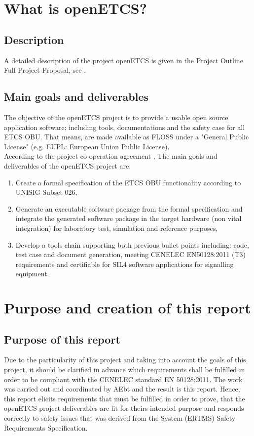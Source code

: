 \documentclass{template/openetcs_report}
\begin{document}
\chapter{What is openETCS?}

\section{Description}
A detailed description of the project openETCS is given in the Project Outline Full Project
Proposal, see \cite{FPP13}.

\section{Main goals and deliverables}
The objective of the openETCS project is to provide a usable open source application software; including tools, documentations and the safety case for all ETCS OBU. That means, are made available as FLOSS under a "General Public License" (e.g. EUPL: European Union Public License).
\\
According to the project co-operation agreement \cite{PCA12}, The main goals and deliverables of the openETCS project are:
\begin{enumerate}
  \item Create a formal specification of the ETCS OBU functionality according to UNISIG Subset 026,
  \item Generate an executable software package from the formal specification and integrate the generated software package in the target hardware (non vital integration) for laboratory test, simulation and reference purposes,  
  \item Develop a tools chain supporting both previous bullet points including: code, test case and document generation, meeting CENELEC EN50128:2011 (T3) requirements and certifiable for SIL4 software applications for signalling equipment.
\end{enumerate}


\chapter{Purpose and creation of this report}

\section{Purpose of this report}
Due to the particularity of this project and taking into account the goals of this project, it should be clarified in advance which requirements shall be fulfilled in order to be compliant with the CENELEC standard EN 50128:2011. The work was carried out and coordinated by AEbt and the result is this report. Hence, this report elicits requirements that must be fulfilled in order to prove, that the openETCS project deliverables are fit for theirs intended purpose and responds correctly to safety issues that was derived from the System (ERTMS) Safety Requirements Specification.
\end{document}
